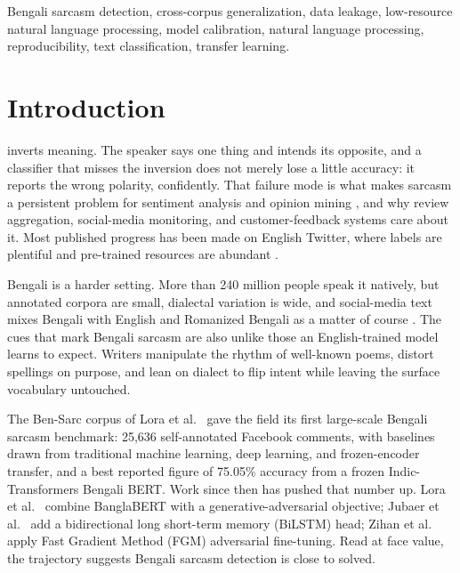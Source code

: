 \documentclass{ieeeaccess}
\newcommand{\dset}[1]{#1}
\begin{document}
\begin{keywords}
Bengali sarcasm detection, cross-corpus generalization, data leakage, low-resource natural language processing, model calibration, natural language processing, reproducibility, text classification, transfer learning.
\end{keywords}

\titlepgskip=-21pt

\maketitle

\section{Introduction}
\label{sec:introduction}

 inverts meaning. The speaker says one thing and intends its opposite, and a classifier that misses the inversion does not merely lose a little accuracy: it reports the wrong polarity, confidently. That failure mode is what makes sarcasm a persistent problem for sentiment analysis and opinion mining \cite{riloff2013sarcasm,joshi2017automatic}, and why review aggregation, social-media monitoring, and customer-feedback systems care about it. Most published progress has been made on English Twitter, where labels are plentiful and pre-trained resources are abundant \cite{bamman2015contextualized,ghosh2018sarcasm}.

Bengali is a harder setting. More than 240 million people speak it natively, but annotated corpora are small, dialectal variation is wide, and social-media text mixes Bengali with English and Romanized Bengali as a matter of course \cite{hossain2021bengali,romim2021hate}. The cues that mark Bengali sarcasm are also unlike those an English-trained model learns to expect. Writers manipulate the rhythm of well-known poems, distort spellings on purpose, and lean on dialect to flip intent while leaving the surface vocabulary untouched.

The \dset{Ben-Sarc} corpus of Lora et al.\ \cite{lora2025bensarc} gave the field its first large-scale Bengali sarcasm benchmark: 25{,}636 self-annotated Facebook comments, with baselines drawn from traditional machine learning, deep learning, and frozen-encoder transfer, and a best reported figure of 75.05\% accuracy from a frozen Indic-Transformers Bengali BERT. Work since then has pushed that number up. Lora et al.\ \cite{lora2023transformer} combine BanglaBERT with a generative-adversarial objective; Jubaer et al.\ \cite{bensarc_revisited2025} add a bidirectional long short-term memory (BiLSTM) head; Zihan et al.\ \cite{zihan2026fgm} apply Fast Gradient Method (FGM) adversarial fine-tuning. Read at face value, the trajectory suggests Bengali sarcasm detection is close to solved.
\end{document}
